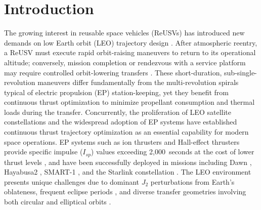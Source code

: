 \documentclass[a4paper,fleqn]{cas-dc}
\begin{document}
\maketitle


\section{Introduction}\label{sec:introduction}

The growing interest in reusable space vehicles (ReUSVs) has introduced new demands on low Earth orbit (LEO) trajectory design \citep{Baiocco2021,Grantz2011}. After atmospheric reentry, a ReUSV must execute rapid orbit-raising maneuvers to return to its operational altitude; conversely, mission completion or rendezvous with a service platform may require controlled orbit-lowering transfers \citep{Jung2025}. These short-duration, sub-single-revolution maneuvers differ fundamentally from the multi-revolution spirals typical of electric propulsion (EP) station-keeping, yet they benefit from continuous thrust optimization to minimize propellant consumption and thermal loads during the transfer. Concurrently, the proliferation of LEO satellite constellations and the widespread adoption of EP systems \citep{Lev2019} have established continuous thrust trajectory optimization as an essential capability for modern space operations. EP systems such as ion thrusters and Hall-effect thrusters provide specific impulse ($I_{sp}$) values exceeding 2,000~seconds at the cost of lower thrust levels \citep{Jahn1968,Goebel2008}, and have been successfully deployed in missions including Dawn \citep{Rayman2000}, Hayabusa2 \citep{Tsuda2020}, SMART-1 \citep{Racca2002}, and the Starlink constellation \citep{SpaceNews2023}. The LEO environment presents unique challenges due to dominant $J_2$ perturbations from Earth's oblateness, frequent eclipse periods \citep{Graham2016}, and diverse transfer geometries involving both circular and elliptical orbits \citep{Topputo2014}.
\end{document}
